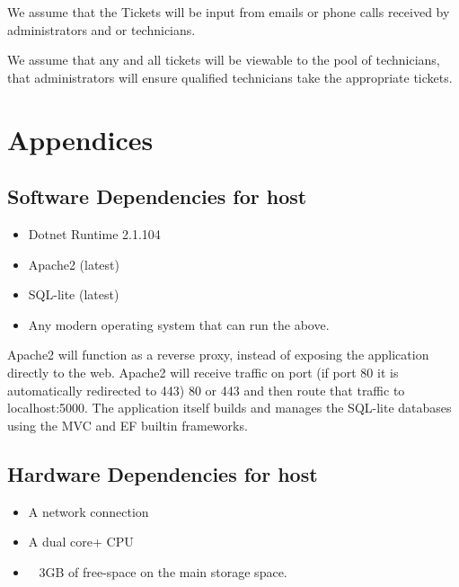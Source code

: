 \documentclass[letterpaper]{article}
\begin{document}
We assume that the Tickets will be input from emails or phone calls received by administrators and or technicians. 

We assume that any and all tickets will be viewable to the pool of technicians, that administrators will ensure qualified technicians take the appropriate tickets.

\pagebreak

\section{Appendices}

\subsection{Software Dependencies for host}
  \begin{itemize}
    \item Dotnet Runtime 2.1.104
    \item Apache2 (latest)
    \item SQL-lite (latest)
    \item Any modern operating system that can run the above.
  \end{itemize}

  Apache2 will function as a reverse proxy, instead of exposing the application directly to the web. Apache2 will receive traffic on port (if port 80 it is automatically redirected to 443) 80 or 443 and then route that traffic to localhost:5000. 
  The application itself builds and manages the SQL-lite databases using the \gls{MVC} and \gls{EF} builtin frameworks.

\subsection{Hardware Dependencies for host}
  \begin{itemize}
    \item A network connection
    \item A dual core+ CPU
    \item ~ 3GB of free-space on the main storage space.
  \end{itemize}
\end{document}
